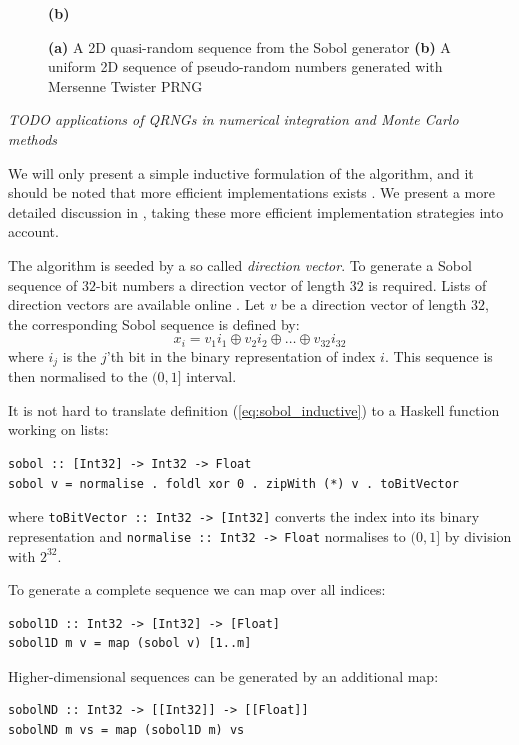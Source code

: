 \documentclass{llncs2e/llncs}
\begin{document}
\begin{figure}
\begin{minipage}{0.45\linewidth}
\begin{center}
      \hspace{0.55cm}\textbf{(b)}
    \end{center}
  \end{minipage}

  \caption{\textbf{(a)} A 2D quasi-random sequence from the Sobol
    generator \textbf{(b)} A uniform 2D sequence of pseudo-random
    numbers generated with Mersenne Twister PRNG}
\label{fig:discrepancyplot}
\end{figure}

\emph{TODO applications of QRNGs in numerical integration and Monte Carlo methods}

We will only present a simple inductive formulation of the algorithm,
and it should be noted that more efficient implementations exists
\cite{bratley1988algorithm, hwy2011emerald}. We present a more
detailed discussion in \cite{dybdalcarlsen2013thesis}, taking these
more efficient implementation strategies into account.

The algorithm is seeded by a so called \emph{direction vector}. To
generate a Sobol sequence of $32$-bit numbers a direction vector of
length $32$ is required.  Lists of direction vectors are available
online \cite{homepage:sobol:directionvectors}. Let $v$ be a direction
vector of length $32$, the corresponding Sobol sequence is defined by:
\begin{equation}
x_i = v_1i_1 \oplus v_2i_2 \oplus \ldots \oplus v_{32}i_{32}\label{eq:sobol_inductive}
\end{equation}
where $i_j$ is the $j$'th bit in the binary representation of index
$i$. This sequence is then normalised to the $(0,1]$ interval.

It is not hard to translate definition (\ref{eq:sobol_inductive}) to a
Haskell function working on lists:
\begin{verbatim}
sobol :: [Int32] -> Int32 -> Float
sobol v = normalise . foldl xor 0 . zipWith (*) v . toBitVector
\end{verbatim}
where \verb|toBitVector :: Int32 -> [Int32]| converts the index into
its binary representation and \verb|normalise :: Int32 -> Float|
normalises to $(0,1]$ by division with $2^{32}$.

To generate a complete sequence we can map over all indices:
\begin{verbatim}
sobol1D :: Int32 -> [Int32] -> [Float]
sobol1D m v = map (sobol v) [1..m]
\end{verbatim}
Higher-dimensional sequences can be generated by an additional map:
\begin{verbatim}
sobolND :: Int32 -> [[Int32]] -> [[Float]]
sobolND m vs = map (sobol1D m) vs
\end{verbatim}
\end{document}
